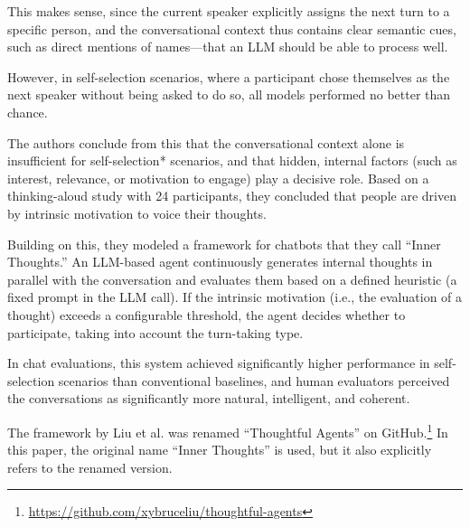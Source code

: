 This makes sense, since the current speaker explicitly assigns the next turn to a specific person, and the
conversational context thus contains clear semantic cues, such as direct mentions of names—that an LLM should
be able to process well.

However, in self-selection scenarios, where a participant chose themselves as the next speaker without being
asked to do so, all models performed no better than chance.
\cite[p.4]{liuProactiveConversationalAgents2025}

The authors conclude from this that the conversational context alone is insufficient for self-selection*
scenarios, and that hidden, internal factors (such as interest, relevance, or motivation to engage) play a
decisive role. \cite[p.4]{liuProactiveConversationalAgents2025} Based on a
thinking-aloud study with 24 participants, they concluded that people are driven by intrinsic motivation to
voice their thoughts. \cite[p.2]{liuProactiveConversationalAgents2025}

Building on this, they modeled a framework for chatbots that they call “Inner Thoughts.” An LLM-based agent
continuously generates internal thoughts in parallel with the conversation and evaluates them based on a
defined heuristic (a fixed prompt in the LLM call). If the intrinsic motivation (i.e., the evaluation of a
thought) exceeds a configurable threshold, the agent decides whether to participate, taking into account the
turn-taking type. \cite{liuProactiveConversationalAgents2025}

In chat evaluations, this system achieved significantly higher performance in self-selection scenarios
than conventional baselines, and human evaluators perceived the conversations as significantly
more natural, intelligent, and coherent. \cite[p.2]{liuProactiveConversationalAgents2025}

The framework by Liu et al. was renamed “Thoughtful Agents” on
GitHub.\footnote{\url{https://github.com/xybruceliu/thoughtful-agents}} In this paper, the
original name “Inner Thoughts” is used, but it also explicitly refers to the renamed version.
